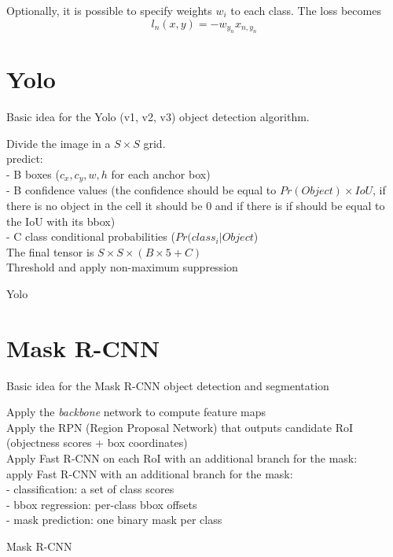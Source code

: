 Optionally, it is possible to specify weights $w_i$ to each class. The loss becomes
\begin{equation}
    l_n(x, y) = -w_{y_n} x_{n, y_n}
\end{equation}
\section{Yolo}
Basic idea for the Yolo (v1, v2, v3) object detection algorithm.

\begin{algorithm}[H]
\DontPrintSemicolon
{}
 Divide the image in a $S\times S$ grid. \\
  { predict: \\
  - B boxes ($c_x, c_y, w, h$ for each anchor box) \\
  - B confidence values (the confidence should be equal to $Pr(Object) \times IoU$, if there is no object in the cell it should be 0 and if there is if should be equal to the IoU with its bbox) \\
  - C class conditional probabilities ($Pr(class_i|Object$) \\}
 The final tensor is $S\times S \times (B \times 5 + C)$ \\
 Threshold and apply non-maximum suppression
\caption{Yolo}
\end{algorithm}


\section{Mask R-CNN}
Basic idea for the Mask R-CNN object detection and segmentation

\begin{algorithm}[H]
\DontPrintSemicolon
{}
 Apply the \textit{backbone} network to compute feature maps \\
 Apply the RPN (Region Proposal Network) that outputs candidate RoI (objectness scores + box coordinates) \\
 Apply Fast R-CNN on each RoI with an additional branch for the mask:\\
 {
  apply Fast R-CNN with an additional branch for the mask: \\
 - classification: a set of class scores  \\
 - bbox regression: per-class bbox offsets \\
 - mask prediction: one binary mask per class 
 }
 \caption{Mask R-CNN}
\end{algorithm}

